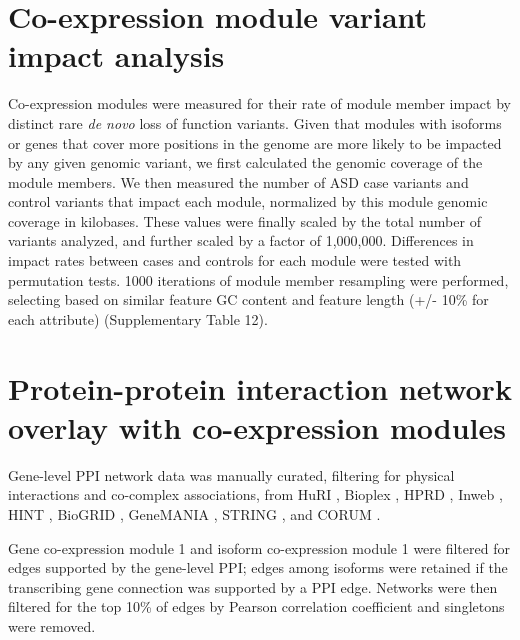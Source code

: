 \documentclass[12pt,chapterheads,final]{ucsd}
\begin{document}
\section{Co-expression module variant impact analysis}
Co-expression modules were measured for their rate of module member impact by distinct rare \textit{de novo} loss of function variants. Given that modules with isoforms or genes that cover more positions in the genome are more likely to be impacted by any given genomic variant, we first calculated the genomic coverage of the module members. We then measured the number of ASD case variants and control variants that impact each module, normalized by this module genomic coverage in kilobases. These values were finally scaled by the total number of variants analyzed, and further scaled by a factor of 1,000,000. Differences in impact rates between cases and controls for each module were tested with permutation tests. 1000 iterations of module member resampling were performed, selecting based on similar feature GC content and feature length (+/- 10\% for each attribute) (Supplementary Table 12).

\section{Protein-protein interaction network overlay with co-expression modules}
Gene-level PPI network data was manually curated, filtering for physical interactions and co-complex associations, from HuRI \cite{Yang2016}, Bioplex \cite{Huttlin2015}, HPRD \cite{KeshavaPrasad2009}, Inweb \cite{Lage2007}, HINT \cite{Das2012}, BioGRID \cite{Chatr-Aryamontri2017}, GeneMANIA \cite{Zuberi2013}, STRING \cite{Szklarczyk2017}, and CORUM \cite{Ruepp2009}. \par
Gene co-expression module 1 and isoform co-expression module 1 were filtered for edges supported by the gene-level PPI; edges among isoforms were retained if the transcribing gene connection was supported by a PPI edge. Networks were then filtered for the top 10\% of edges by Pearson correlation coefficient and singletons were removed.
\end{document}
